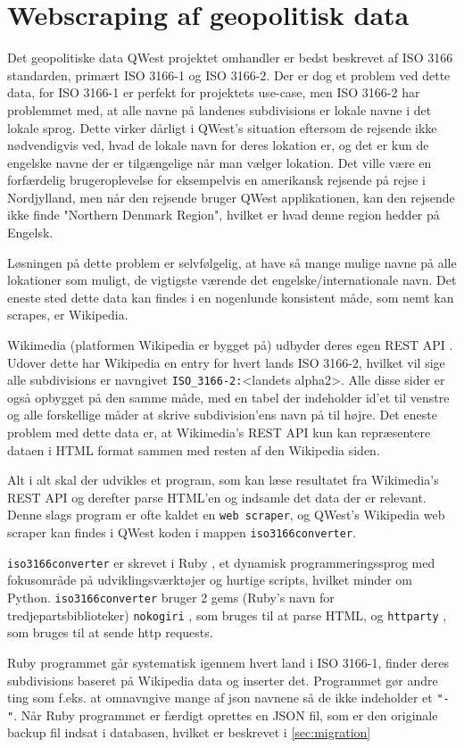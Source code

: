 \section{Webscraping af geopolitisk data}\label{sec:datascraping}
Det geopolitiske data QWest projektet omhandler er bedst beskrevet af ISO 3166 standarden\cite{ISO3166}, primært ISO 3166-1 og ISO 3166-2. Der er dog et problem ved dette data, for ISO 3166-1 er perfekt for projektets use-case, men ISO 3166-2 har problemmet med, at alle navne på landenes subdivisions er lokale navne i det lokale sprog. Dette virker dårligt i QWest's situation eftersom de rejsende ikke nødvendigvis ved, hvad de lokale navn for deres lokation er, og det er kun de engelske navne der er tilgængelige når man vælger lokation. Det ville være en forfærdelig brugeroplevelse for eksempelvis en amerikansk rejsende på rejse i Nordjylland, men når den rejsende bruger QWest applikationen, kan den rejsende ikke finde "Northern Denmark Region", hvilket er hvad denne region hedder på Engelsk.

Løsningen på dette problem er selvfølgelig, at have så mange mulige navne på alle lokationer som muligt, de vigtigste værende det engelske/internationale navn. Det eneste sted dette data kan findes i en nogenlunde konsistent måde, som nemt kan scrapes, er Wikipedia.

Wikimedia (platformen Wikipedia er bygget på) udbyder deres egen REST API \cite{Wikimedia-REST-API-Documentation}. Udover dette har Wikipedia en entry for hvert lands ISO 3166-2, hvilket vil sige alle subdivisions er navngivet \texttt{ISO\_3166-2:}<landets alpha2>. Alle disse sider er også opbygget på den samme måde, med en tabel der indeholder id'et til venstre og alle forskellige måder at skrive subdivision'ens navn på til højre. Det eneste problem med dette data er, at Wikimedia's REST API kun kan repræsentere dataen i HTML format sammen med resten af den Wikipedia siden.

Alt i alt skal der udvikles et program, som kan læse resultatet fra Wikimedia's REST API og derefter parse HTML'en og indsamle det data der er relevant. 
Denne slags program er ofte kaldet en \texttt{web scraper}, og QWest's Wikipedia web scraper kan findes i QWest koden i mappen \texttt{iso3166converter}.

\texttt{iso3166converter} er skrevet i Ruby \cite{RubyLang}, et dynamisk programmeringssprog med fokusområde på udviklingsværktøjer og hurtige scripts, hvilket minder om Python\cite{python}. \texttt{iso3166converter} bruger 2 gems (Ruby's navn for tredjepartsbiblioteker) \texttt{nokogiri} \cite{nokogiri}, som bruges til at parse HTML, og \texttt{httparty} \cite{httparty}, som bruges til at sende http requests.

Ruby programmet går systematisk igennem hvert land i ISO 3166-1, finder deres subdivisions baseret på Wikipedia data og inserter det. Programmet gør andre ting som f.eks. at omnavngive mange af json navnene så de ikke indeholder et \texttt{"-"}. Når Ruby programmet er færdigt oprettes en JSON fil, som er den originale backup fil indsat i databasen, hvilket er beskrevet i \ref{sec:migration}